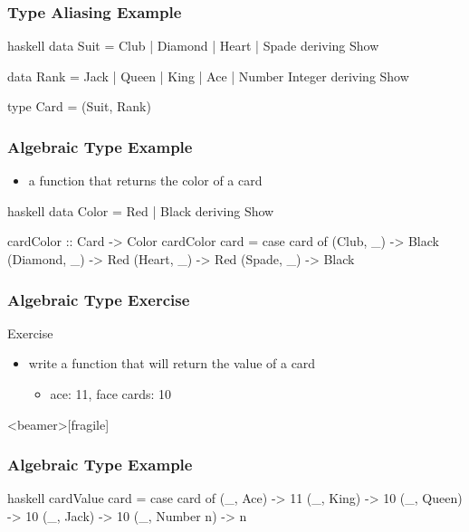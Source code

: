 \documentclass[dvipsnames]{beamer}
\theoremstyle{plain}
\begin{document}
\begin{frame}[fragile]
  \frametitle{Type Aliasing Example}

  \begin{example}
    \begin{pygments}{haskell}
data Suit = Club | Diamond | Heart | Spade
            deriving Show

data Rank = Jack | Queen | King | Ace | Number Integer
            deriving Show

type Card = (Suit, Rank)
    \end{pygments}
  \end{example}
\end{frame}

\begin{frame}[fragile]
  \frametitle{Algebraic Type Example}

  \begin{example}
    \begin{itemize}
      \item a function that returns the color of a card
    \end{itemize}

    \pause
    \begin{pygments}{haskell}
data Color = Red | Black
             deriving Show

cardColor :: Card -> Color
cardColor card =
    case card of
      (Club, _) -> Black
      (Diamond, _) -> Red
      (Heart, _) -> Red
      (Spade, _) -> Black
    \end{pygments}
  \end{example}
\end{frame}

\begin{frame}
  \frametitle{Algebraic Type Exercise}

  \begin{block}{Exercise}
    \begin{itemize}
      \item write a function that will return the value of a card
      \begin{itemize}
        \item ace: 11, face cards: 10
      \end{itemize}
    \end{itemize}
  \end{block}
\end{frame}

\begin{frame}<beamer>[fragile]
  \frametitle{Algebraic Type Example}

  \begin{example}
    \begin{pygments}{haskell}
cardValue card =
    case card of
      (_, Ace) -> 11
      (_, King) -> 10
      (_, Queen) -> 10
      (_, Jack) -> 10
      (_, Number n) -> n
    \end{pygments}
  \end{example}
\end{frame}
\end{document}
